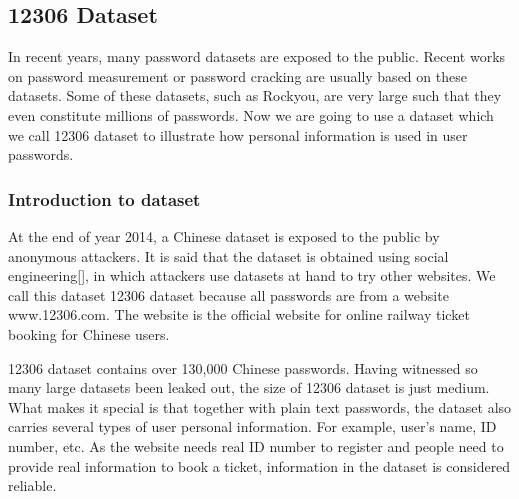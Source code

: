 \documentclass{sig-alternate}
\begin{document}
\subsection{12306 Dataset}
In recent years, many password datasets are exposed to the public. Recent works on password measurement or password cracking are usually based on these datasets. Some of these datasets, such as Rockyou, are very large such that they even constitute millions of passwords. Now we are going to use a dataset which we call 12306 dataset to illustrate how personal information is used in user passwords.
\subsubsection{Introduction to dataset}
At the end of year 2014, a Chinese dataset is exposed to the public by anonymous attackers. It is said that the dataset is obtained using social engineering[], in which attackers use datasets at hand to try other websites. We call this dataset 12306 dataset because all passwords are from a website www.12306.com. The website is the official website for online railway ticket booking for Chinese users.

12306 dataset contains over 130,000 Chinese passwords. Having witnessed so many large datasets been leaked out, the size of 12306 dataset is just medium. What makes it special is that together with plain text passwords, the dataset also carries several types of user personal information. For example, user's name, ID number, etc. As the website needs real ID number to register and people need to provide real information to book a ticket, information in the dataset is considered reliable.
\end{document}
